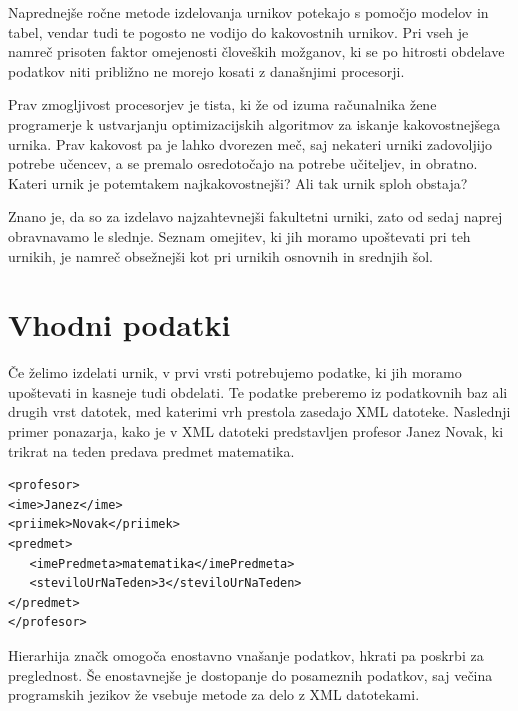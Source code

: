 \documentclass[a4paper,10pt]{article}
\begin{document}
Naprednejše ročne metode izdelovanja urnikov potekajo s pomočjo modelov in tabel, vendar
tudi te pogosto ne vodijo do kakovostnih urnikov. Pri vseh je namreč prisoten faktor
omejenosti človeških možganov, ki se po hitrosti obdelave podatkov niti približno ne
morejo kosati z današnjimi procesorji.

Prav zmogljivost procesorjev je tista, ki že od izuma računalnika žene programerje k
ustvarjanju optimizacijskih algoritmov za iskanje kakovostnejšega urnika. Prav kakovost
pa je lahko dvorezen meč, saj nekateri urniki zadovoljijo potrebe učencev, a se premalo
osredotočajo na potrebe učiteljev, in obratno. Kateri urnik je potemtakem najkakovostnejši?
Ali tak urnik sploh obstaja?

Znano je, da so za izdelavo najzahtevnejši fakultetni urniki, zato od sedaj naprej
obravnavamo le slednje. Seznam omejitev, ki jih moramo upoštevati pri teh urnikih,
je namreč obsežnejši kot pri urnikih osnovnih in srednjih šol.

\section{Vhodni podatki}

Če želimo izdelati urnik, v prvi vrsti potrebujemo podatke, ki jih moramo upoštevati in
kasneje tudi obdelati. Te podatke preberemo iz podatkovnih baz ali drugih vrst datotek,
med katerimi vrh prestola zasedajo XML datoteke. Naslednji primer ponazarja, kako je v
XML datoteki predstavljen profesor Janez Novak, ki trikrat na teden predava predmet
matematika.


\begin{verbatim}
<profesor>
<ime>Janez</ime>
<priimek>Novak</priimek>
<predmet>
   <imePredmeta>matematika</imePredmeta>
   <steviloUrNaTeden>3</steviloUrNaTeden>
</predmet>
</profesor>
\end{verbatim} 
   
\noindent Hierarhija značk omogoča enostavno vnašanje podatkov, hkrati pa poskrbi za preglednost.
Še enostavnejše je dostopanje do posameznih podatkov, saj večina programskih jezikov že
vsebuje metode za delo z XML datotekami.
\end{document}
